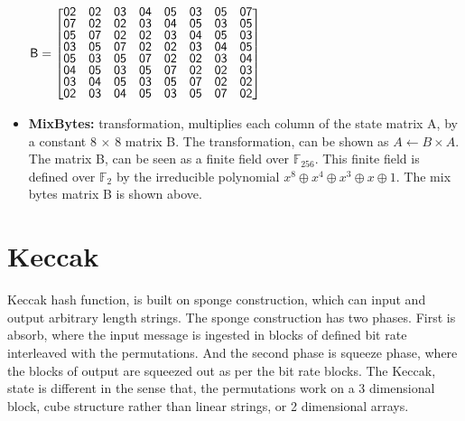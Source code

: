 \begin{itemize}
  \begin{center}
  $\mathsf{B} = \renewcommand\arraystretch{0.75}
  \begin{bmatrix}
  \mathsf{02} & \mathsf{02} & \mathsf{03} & \mathsf{04} & \mathsf{05} & \mathsf{03} & \mathsf{05} & \mathsf{07} \\
  \mathsf{07} & \mathsf{02} & \mathsf{02} & \mathsf{03} & \mathsf{04} & \mathsf{05} & \mathsf{03} & \mathsf{05} \\
  \mathsf{05} & \mathsf{07} & \mathsf{02} & \mathsf{02} & \mathsf{03} & \mathsf{04} & \mathsf{05} & \mathsf{03} \\
  \mathsf{03} & \mathsf{05} & \mathsf{07} & \mathsf{02} & \mathsf{02} & \mathsf{03} & \mathsf{04} & \mathsf{05} \\
  \mathsf{05} & \mathsf{03} & \mathsf{05} & \mathsf{07} & \mathsf{02} & \mathsf{02} & \mathsf{03} & \mathsf{04} \\
  \mathsf{04} & \mathsf{05} & \mathsf{03} & \mathsf{05} & \mathsf{07} & \mathsf{02} & \mathsf{02} & \mathsf{03} \\
  \mathsf{03} & \mathsf{04} & \mathsf{05} & \mathsf{03} & \mathsf{05} & \mathsf{07} & \mathsf{02} & \mathsf{02} \\
  \mathsf{02} & \mathsf{03} & \mathsf{04} & \mathsf{05} & \mathsf{03} & \mathsf{05} & \mathsf{07} & \mathsf{02} \\
  \end{bmatrix}$
  \end{center}
  
  \item {\bf MixBytes:} transformation, multiplies each column of the state matrix A, by a constant 8 $\times$ 8 matrix B.
  The transformation, can be shown as $ A \gets B \times A$. The matrix B, can be seen as a finite field over $\mathbb{F}_{256}$.
  This finite field is defined over $\mathbb{F}_{2}$ by the irreducible polynomial $x^{8} \oplus x^{4} \oplus x^{3} \oplus x \oplus 1$.
  The mix bytes matrix B is shown above.

  \end{itemize}

\section{Keccak}
Keccak hash function, is built on sponge construction, which can input and output arbitrary length strings. The sponge
construction has two phases. First is absorb, where the input message is ingested in blocks of defined bit rate interleaved
with the permutations. And the second phase is squeeze phase, where the blocks of output are squeezed out as per the 
bit rate blocks. The Keccak, state is different in the sense that, the permutations work on a 3 dimensional block, cube
structure rather than linear strings, or 2 dimensional arrays.

